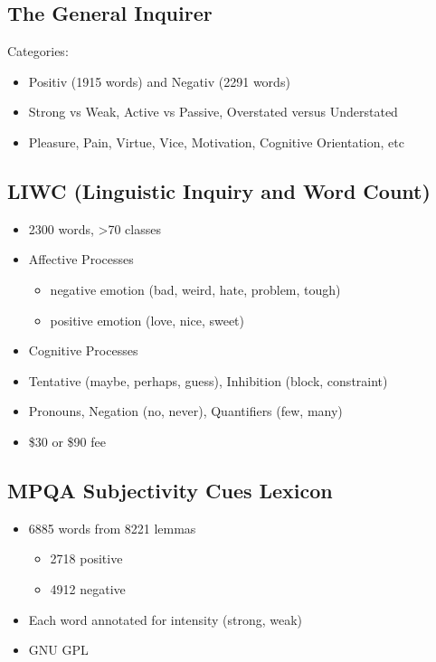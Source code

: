 \documentclass[11pt]{article}
\theoremstyle{definition}
\begin{document}
\subsection{The General Inquirer}
Categories:

\begin{itemize}
  \item Positiv (1915 words) and Negativ (2291 words)
  \item Strong vs Weak, Active vs Passive, Overstated versus Understated
  \item Pleasure, Pain, Virtue, Vice, Motivation, Cognitive Orientation, etc
\end{itemize}

\subsection{LIWC (Linguistic Inquiry and Word Count)}
\begin{itemize}
  \item 2300 words, >70 classes
  \item Affective Processes
  \begin{itemize}
    \item negative emotion (bad, weird, hate, problem, tough)
    \item positive emotion (love, nice, sweet)
  \end{itemize}
  \item Cognitive Processes
  \item Tentative (maybe, perhaps, guess), Inhibition (block, constraint)
  \item Pronouns, Negation (no, never), Quantifiers (few, many)
  \item \$30 or \$90 fee
\end{itemize}

\subsection{MPQA Subjectivity Cues Lexicon}
\begin{itemize}
  \item 6885 words from 8221 lemmas
  \begin{itemize}
    \item 2718 positive
    \item 4912 negative
  \end{itemize}
  \item Each word annotated for intensity (strong, weak)
  \item GNU GPL
\end{itemize}
\end{document}
